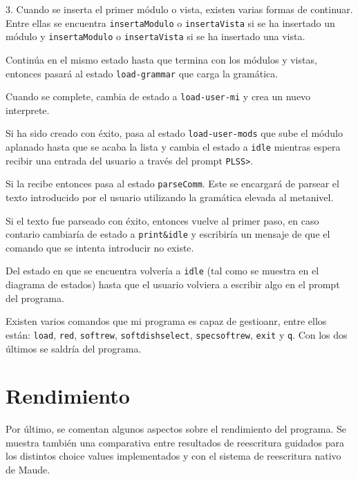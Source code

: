 3. Cuando se inserta el primer módulo o vista, existen varias formas de continuar. Entre ellas se encuentra \texttt{insertaModulo} o \texttt{insertaVista} si se ha insertado un módulo y \texttt{insertaModulo} o \texttt{insertaVista} si se ha insertado una vista.

Continúa en el mismo estado hasta que termina con los módulos y vistas, entonces pasará al estado \texttt{load-grammar} que carga la gramática.

Cuando se complete, cambia de estado a \texttt{load-user-mi} y crea un nuevo interprete.

Si ha sido creado con éxito, pasa al estado \texttt{load-user-mods} que sube el módulo aplanado hasta que se acaba la lista y cambia el estado a \texttt{idle} mientras espera recibir una entrada del usuario a través del prompt \texttt{PLSS>}.

Si la recibe entonces pasa al estado \texttt{parseComm}. Este se encargará de parsear el texto introducido por el usuario utilizando la gramática elevada al metanivel.

Si el texto fue parseado con éxito, entonces vuelve al primer paso, en caso contario cambiaría de estado a \texttt{print\&idle} y escribiría un mensaje de que el comando que se intenta introducir no existe.

Del estado en que se encuentra volvería a \texttt{idle} (tal como se muestra en el diagrama de estados) hasta que el usuario volviera a escribir algo en el prompt del programa.

Existen varios comandos que mi programa es capaz de gestioanr, entre ellos están: \texttt{load}, \texttt{red}, \texttt{softrew}, \texttt{softdishselect}, \texttt{specsoftrew}, \texttt{exit} y \texttt{q}. Con los dos últimos se saldría del programa.



\medskip





\section{Rendimiento}
Por último, se comentan algunos aspectos sobre el rendimiento del programa.
Se muestra también una comparativa entre resultados de reescritura guidados para los distintos choice values implementados y con el sistema de reescritura nativo de Maude.
\medskip








